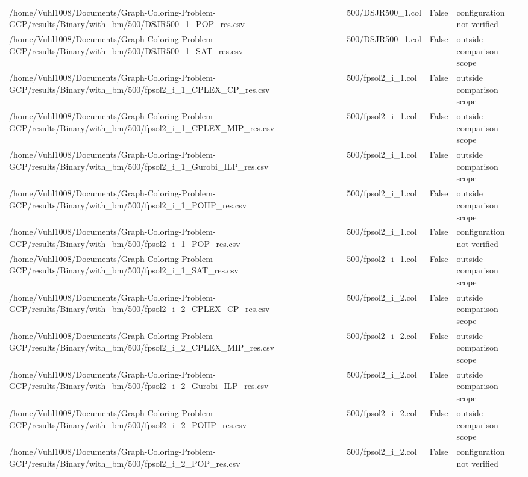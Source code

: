\begin{table}[htbp]
\begin{tabular}{llll}
/home/Vuhl1008/Documents/Graph-Coloring-Problem-GCP/results/Binary/with\_bm/500/DSJR500\_1\_POP\_res.csv & 500/DSJR500\_1.col & False & configuration not verified \\
/home/Vuhl1008/Documents/Graph-Coloring-Problem-GCP/results/Binary/with\_bm/500/DSJR500\_1\_SAT\_res.csv & 500/DSJR500\_1.col & False & outside comparison scope \\
/home/Vuhl1008/Documents/Graph-Coloring-Problem-GCP/results/Binary/with\_bm/500/fpsol2\_i\_1\_CPLEX\_CP\_res.csv & 500/fpsol2\_i\_1.col & False & outside comparison scope \\
/home/Vuhl1008/Documents/Graph-Coloring-Problem-GCP/results/Binary/with\_bm/500/fpsol2\_i\_1\_CPLEX\_MIP\_res.csv & 500/fpsol2\_i\_1.col & False & outside comparison scope \\
/home/Vuhl1008/Documents/Graph-Coloring-Problem-GCP/results/Binary/with\_bm/500/fpsol2\_i\_1\_Gurobi\_ILP\_res.csv & 500/fpsol2\_i\_1.col & False & outside comparison scope \\
/home/Vuhl1008/Documents/Graph-Coloring-Problem-GCP/results/Binary/with\_bm/500/fpsol2\_i\_1\_POHP\_res.csv & 500/fpsol2\_i\_1.col & False & outside comparison scope \\
/home/Vuhl1008/Documents/Graph-Coloring-Problem-GCP/results/Binary/with\_bm/500/fpsol2\_i\_1\_POP\_res.csv & 500/fpsol2\_i\_1.col & False & configuration not verified \\
/home/Vuhl1008/Documents/Graph-Coloring-Problem-GCP/results/Binary/with\_bm/500/fpsol2\_i\_1\_SAT\_res.csv & 500/fpsol2\_i\_1.col & False & outside comparison scope \\
/home/Vuhl1008/Documents/Graph-Coloring-Problem-GCP/results/Binary/with\_bm/500/fpsol2\_i\_2\_CPLEX\_CP\_res.csv & 500/fpsol2\_i\_2.col & False & outside comparison scope \\
/home/Vuhl1008/Documents/Graph-Coloring-Problem-GCP/results/Binary/with\_bm/500/fpsol2\_i\_2\_CPLEX\_MIP\_res.csv & 500/fpsol2\_i\_2.col & False & outside comparison scope \\
/home/Vuhl1008/Documents/Graph-Coloring-Problem-GCP/results/Binary/with\_bm/500/fpsol2\_i\_2\_Gurobi\_ILP\_res.csv & 500/fpsol2\_i\_2.col & False & outside comparison scope \\
/home/Vuhl1008/Documents/Graph-Coloring-Problem-GCP/results/Binary/with\_bm/500/fpsol2\_i\_2\_POHP\_res.csv & 500/fpsol2\_i\_2.col & False & outside comparison scope \\
/home/Vuhl1008/Documents/Graph-Coloring-Problem-GCP/results/Binary/with\_bm/500/fpsol2\_i\_2\_POP\_res.csv & 500/fpsol2\_i\_2.col & False & configuration not verified \\

\end{tabular}
\end{table}
